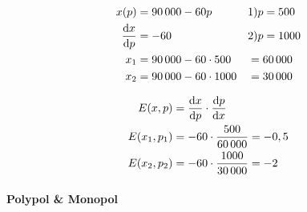 \begin{alignat*}{2}
    x(p) &= 90\,000-60p\quad &&1) p=500\\
    \frac{\mathop{}\!\mathrm{d} x}{\mathop{}\!\mathrm{d} p} &= -60 &&2) p=1000 \\
    x_1 &= 90\,000 - 60 \cdot 500 &&= 60\,000  \\
    x_2 &= 90\,000 - 60 \cdot 1000 &&= 30\,000 
\end{alignat*}

\begin{align*}
    E(x, p) &= \frac{\mathop{}\!\mathrm{d} x}{\mathop{}\!\mathrm{d} p} \cdot \frac{\mathop{}\!\mathrm{d} p}{\mathop{}\!\mathrm{d} x} \\
    E(x_1, p_1) &= -60 \cdot \frac{500}{60\,000} = -0,5 \\
    E(x_2, p_2) &= -60 \cdot \frac{1000}{30\,000} = -2
\end{align*}

\paragraph{Polypol \& Monopol}

